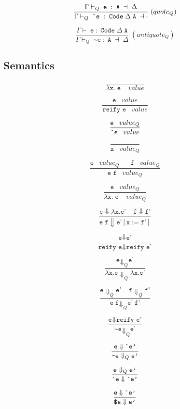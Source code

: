 \documentclass{article}
\begin{document}
$$
\frac
  {\Gamma \vdash_{Q} \; \texttt{e} \; : \; \texttt{A} \; \dashv \; \Delta}
  {\Gamma \vdash_{Q} \; \texttt{\textasciigrave e} \; : \; \texttt{Code} \; \Delta \; \texttt{A} \; \dashv \cdot}
  \; (quote_{Q})
$$

$$
\frac
  {\Gamma \vdash \; \texttt{e} \; : \; \texttt{Code} \; \Delta \; \texttt{A}}
  {\Gamma \vdash_{Q} \; \texttt{\textasciitilde e} \; : \; \texttt{A} \; \dashv \; \Delta}
  \; (antiquote_Q)
$$

\subsection{Semantics}

$$
\frac{}{\lambda \texttt{x.} \; \texttt{e} \; \; \; \; value}
$$

$$
\frac{\texttt{e} \; \; \; value }{\texttt{reify e} \; \; \; value}
$$

$$
\frac{\texttt{e} \; \; \; value_{Q} }{\texttt{\textasciigrave e} \; \; \; value}
$$

$$
\frac{}{\texttt{x} \; \; \; value_{Q}}
$$

$$
\frac{\texttt{e} \; \; \; value_{Q} \;\;\;\;\;\; \texttt{f} \;\;\; value_{Q}}{\texttt{e f} \; \; \; value_{Q}}
$$

$$
\frac{\texttt{e} \;\;\; value_{Q}}{\lambda \texttt{x.} \; \texttt{e} \; \; \; \; value_{Q}}
$$

$$
\frac
    {\texttt{e} \Downarrow \lambda \texttt{x.} \texttt{e'} \; \; \; \; \texttt{f} \Downarrow \texttt{f'}}
    {\texttt{e} \; \texttt{f} \Downarrow \texttt{e'}[\texttt{x} := \texttt{f'}]}
$$

$$
\frac
    {\texttt{e} \Downarrow \texttt{e'}}
    {\texttt{reify e} \Downarrow \texttt{reify e'}}
$$

$$
\frac
    {\texttt{e} \Downarrow_{Q} \texttt{e'}}
    {\lambda \texttt{x.} \texttt{e} \Downarrow_{Q} \lambda \texttt{x.} \texttt{e'}}
$$

$$
\frac
    {\texttt{e} \Downarrow_{Q} \texttt{e'} \;\;\;\; \texttt{f} \Downarrow_{Q} \texttt{f'}}
    {\texttt{e} \; \texttt{f} \Downarrow_{Q} \texttt{e'} \; \texttt{f'}}
$$

$$
\frac
    {\texttt{e} \Downarrow \texttt{reify e'}}
    {\texttt{\textasciitilde} \texttt{e} \Downarrow_{Q} \texttt{e'}}
$$

$$
\frac
    {\texttt{e} \Downarrow \texttt{\textasciigrave e'}}
    {\texttt{\textasciitilde} \texttt{e} \Downarrow_{Q} \texttt{e'}}
$$

$$
\frac
    {\texttt{e} \Downarrow_{Q} \texttt{e'}}
    {\texttt{\textasciigrave e} \Downarrow \texttt{\textasciigrave e'}}
$$

$$
\frac
    {\texttt{e} \Downarrow \texttt{\textasciigrave e'}}
    {\texttt{\textdollar} \texttt{e} \Downarrow \texttt{e'}}
$$
\end{document}
